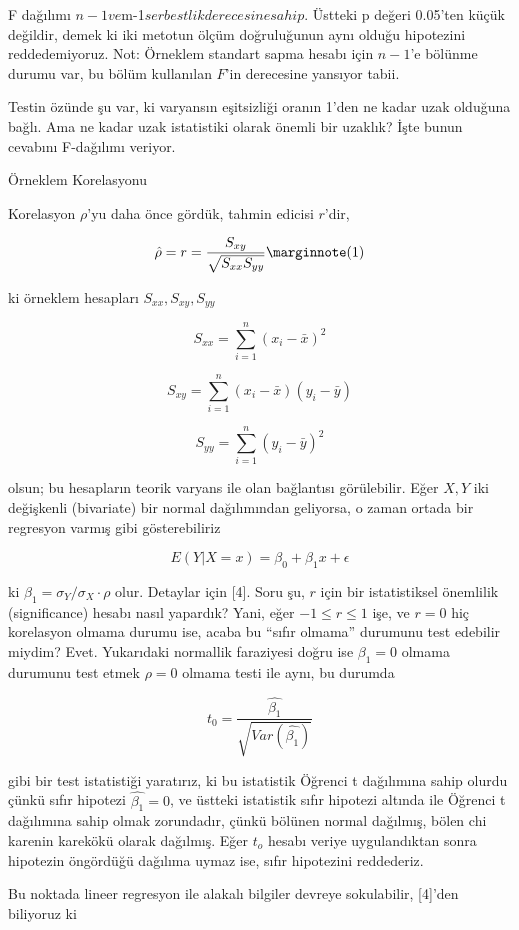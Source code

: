 \documentclass[12pt,fleqn]{article}\usepackage{../../common}
\begin{document}
F dağılımı $n-1 ve $m-1$ serbestlik derecesine sahip. $ Üstteki p değeri
0.05'ten küçük değildir, demek ki iki metotun ölçüm doğruluğunun aynı olduğu
hipotezini reddedemiyoruz. Not: Örneklem standart sapma hesabı için $n-1$'e
bölünme durumu var, bu bölüm kullanılan $F$'in derecesine yansıyor tabii.

Testin özünde şu var, ki varyansın eşitsizliği oranın 1'den ne kadar uzak
olduğuna bağlı. Ama ne kadar uzak istatistiki olarak önemli bir uzaklık? İşte
bunun cevabını F-dağılımı veriyor. 

Örneklem Korelasyonu 

Korelasyon $\rho$'yu daha önce gördük, tahmin edicisi $r$'dir, 

$$ 
\hat{\rho} = r = \frac{S_{xy}}{\sqrt{S_{xx}S_{yy}}} 
\mlabel{1} 
$$

ki örneklem hesapları $S_{xx},S_{xy},S_{yy}$ 

$$ S_{xx} = \sum _{i=1}^{n} (x_i-\bar{x})^2 $$

$$ S_{xy} = \sum _{i=1}^{n} (x_i-\bar{x})(y_i-\bar{y}) $$

$$ S_{yy} = \sum _{i=1}^{n} (y_i-\bar{y})^2 $$

olsun; bu hesapların teorik varyans ile olan bağlantısı görülebilir. Eğer
$X,Y$ iki değişkenli (bivariate) bir normal dağılımından geliyorsa, o zaman
ortada bir regresyon varmış gibi gösterebiliriz

$$ E(Y|X=x) = \beta_0 + \beta_1 x + \epsilon $$

ki $\beta_1 = \sigma_Y / \sigma_X \cdot \rho$ olur. Detaylar için [4]. Soru şu, $r$ için bir  istatistiksel 
önemlilik (significance) hesabı nasıl yapardık? Yani, eğer $-1 \le r \le 1$
işe,  ve $r=0$ hiç korelasyon olmama durumu ise, acaba bu ``sıfır olmama'' 
durumunu test edebilir miydim? Evet. Yukarıdaki normallik faraziyesi doğru 
ise $\beta_1 = 0$ olmama durumunu test etmek $\rho = 0$ olmama testi ile aynı, bu durumda

$$ t_0 = \frac{\hat{\beta_1}}{\sqrt{ Var(\hat{\beta_1} ) }} $$

gibi bir test istatistiği yaratırız, ki bu istatistik Öğrenci t dağılımına
sahip olurdu çünkü sıfır hipotezi $\hat{\beta_1} = 0$, ve üstteki
istatistik sıfır hipotezi altında ile Öğrenci t dağılımına sahip olmak
zorundadır, çünkü bölünen normal dağılmış, bölen chi karenin karekökü
olarak dağılmış. Eğer $t_o$ hesabı veriye uygulandıktan sonra hipotezin
öngördüğü dağılıma uymaz ise, sıfır hipotezini reddederiz. 

Bu noktada lineer regresyon ile alakalı bilgiler devreye sokulabilir,
[4]'den biliyoruz ki
\end{document}
